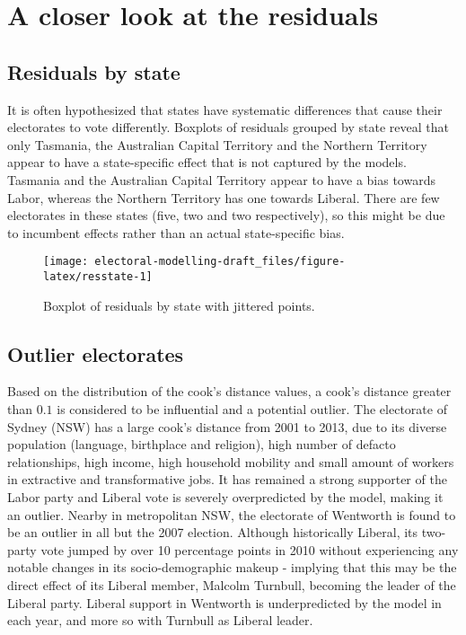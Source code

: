 \documentclass[openany]{book}
\begin{document}
\hypertarget{a-closer-look-at-the-residuals}{%
\section{A closer look at the residuals}\label{a-closer-look-at-the-residuals}}

\hypertarget{residuals-by-state}{%
\subsection{Residuals by state}\label{residuals-by-state}}

It is often hypothesized that states have systematic differences that cause their electorates to vote differently. Boxplots of residuals grouped by state reveal that only Tasmania, the Australian Capital Territory and the Northern Territory appear to have a state-specific effect that is not captured by the models. Tasmania and the Australian Capital Territory appear to have a bias towards Labor, whereas the Northern Territory has one towards Liberal. There are few electorates in these states (five, two and two respectively), so this might be due to incumbent effects rather than an actual state-specific bias.

\begin{figure}[h]

{\centering \texttt{[image: electoral-modelling-draft\_files/figure-latex/resstate-1]} 

}

\caption{Boxplot of residuals by state with jittered points.}\label{fig:resstate}
\end{figure}

\hypertarget{outlier-electorates}{%
\subsection{Outlier electorates}\label{outlier-electorates}}

Based on the distribution of the cook's distance values, a cook's distance greater than \(0.1\) is considered to be influential and a potential outlier. The electorate of Sydney (NSW) has a large cook's distance from 2001 to 2013, due to its diverse population (language, birthplace and religion), high number of defacto relationships, high income, high household mobility and small amount of workers in extractive and transformative jobs. It has remained a strong supporter of the Labor party and Liberal vote is severely overpredicted by the model, making it an outlier. Nearby in metropolitan NSW, the electorate of Wentworth is found to be an outlier in all but the 2007 election. Although historically Liberal, its two-party vote jumped by over 10 percentage points in 2010 without experiencing any notable changes in its socio-demographic makeup - implying that this may be the direct effect of its Liberal member, Malcolm Turnbull, becoming the leader of the Liberal party. Liberal support in Wentworth is underpredicted by the model in each year, and more so with Turnbull as Liberal leader.
\end{document}
